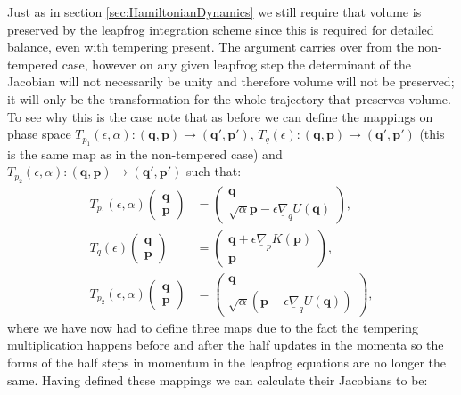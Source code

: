 \documentclass[12pt]{article}
\begin{document}
    Just as in section \ref{sec:HamiltonianDynamics} we still require that volume is preserved by the leapfrog integration scheme since this is required for detailed balance, even with tempering present. The argument carries over from the non-tempered case, however on any given leapfrog step the determinant of the Jacobian will not necessarily be unity and therefore volume will not be preserved; it will only be the transformation for the whole trajectory that preserves volume. To see why this is the case note that as before we can define the mappings on phase space $T_{p_1}\left(\epsilon,\alpha\right): \left(\bm{q},\bm{p}\right) \rightarrow \left(\bm{q}',\bm{p}'\right)$, $T_{q}\left(\epsilon\right): \left(\bm{q},\bm{p}\right) \rightarrow \left(\bm{q}',\bm{p}'\right)$ (this is the same map as in the non-tempered case) and $T_{p_2}\left(\epsilon,\alpha\right): \left(\bm{q},\bm{p}\right) \rightarrow \left(\bm{q}',\bm{p}'\right)$ such that:
    \begin{align}
        T_{p_1}\left(\epsilon,\alpha\right)\begin{pmatrix} \bm{q} \\ \bm{p} \end{pmatrix} & = \begin{pmatrix} \bm{q} \\ \sqrt{\alpha}\bm{p} - \epsilon \underline{\nabla}_{q}U\left(\bm{q}\right)\end{pmatrix},\\
        T_{q}\left(\epsilon\right)\begin{pmatrix} \bm{q} \\ \bm{p} \end{pmatrix} & = \begin{pmatrix} \bm{q} + \epsilon \underline{\nabla}_pK\left(\bm{p}\right)  \\ \bm{p} \end{pmatrix},\\
        T_{p_2}\left(\epsilon,\alpha\right)\begin{pmatrix} \bm{q} \\ \bm{p} \end{pmatrix} & = \begin{pmatrix} \bm{q} \\ \sqrt{\alpha}\left(\bm{p} - \epsilon \underline{\nabla}_qU\left(\bm{q}\right)\right)\end{pmatrix},
    \end{align}
    where we have now had to define three maps due to the fact the tempering multiplication happens before and after the half updates in the momenta so the forms of the half steps in momentum in the leapfrog equations are no longer the same. Having defined these mappings we can calculate their Jacobians to be:
\end{document}
